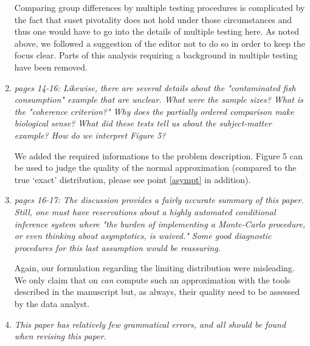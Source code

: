 \documentclass[11pt]{article}
\begin{document}
\begin{enumerate}
Comparing group differences by multiple testing procedures is complicated by
the fact that suset pivotality does not hold under those circumstances and
thus one would have to go into the details of multiple testing here. As
noted above, we followed a suggestion of the editor not to do so in order to
keep the focus clear. Parts of this analysis requiring a background in
multiple testing have been removed.

\item \textsl{pages 14-16:  Likewise, there are several details about the "contaminated fish 
              consumption" example that are unclear. What were the sample sizes? What is the 
              "coherence criterion?" Why does the partially ordered comparison make biological 
              sense? What did these tests tell us about the subject-matter example? How do we 
              interpret Figure 5? }

We added the required informations to the problem description. Figure 5 can
be used to judge the quality of the normal approximation (compared to the
true `exact' distribution, please see point \ref{asympt} in addition).
 
\item \textsl{pages 16-17:  The discussion provides a fairly accurate summary of this paper. 
              Still, one must have reservations about a highly automated conditional inference 
              system where "the burden of implementing a Monte-Carlo procedure, or even thinking 
              about asymptotics, is waived." Some good diagnostic procedures for this last 
              assumption would be reassuring. }
 
Again, our formulation regarding the limiting distribution were misleading.
We only claim that on \textit{can} compute such an approximation with the
tools described in the manuscript but, as always, their quality need to be
assessed by the data analyst.

\item \textsl{This paper has relatively few grammatical errors, and all should be found when 
              revising this paper.}

\end{enumerate}



\end{document}
